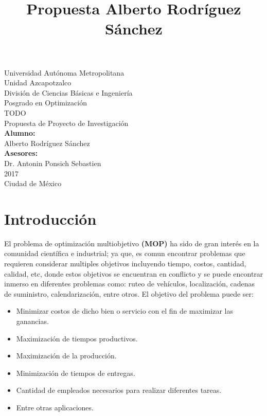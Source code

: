 \documentclass[letterpaper,10pt]{article}
\title{Propuesta Alberto Rodríguez Sánchez}
\begin{document}
\renewcommand{\refname}{Bibliografía}%
\thispagestyle{empty}

\begin{center}
	{\Huge Universidad Autónoma Metropolitana }\\
	{\huge Unidad Azcapotzalco}\\
	\vspace{0.5cm}
	{\Large División de Ciencias Básicas e Ingeniería}\\
	\vspace{1.0cm}
	{\large Posgrado en Optimización}\\
	\vspace{2.0cm}	
	{\Large TODO}\\
	\vspace{1.0cm}
	{\large Propuesta de Proyecto de Investigación}\\
	\vspace{2.0cm}
	{\large\textbf{Alumno:}}\\
	Alberto Rodríguez Sánchez\\
	\vspace{1.5cm}
	\bigskip
	{\large\textbf{Asesores:}}\\ 
	Dr. Antonin Ponsich Sebastien\\
	\vspace{1.5cm}
	 2017\\
	\vspace{1.0cm}
	Ciudad de México\\ 
\end{center}
\newpage
\tableofcontents
\newpage
\section{Introducción}

El problema de optimización multiobjetivo \textbf{(MOP)} ha sido de gran interés en la comunidad científica e industrial; ya que, es comun encontrar problemas que requieren considerar multiples objetivos incluyendo tiempo, costos, cantidad, calidad, etc, donde estos objetivos se encuentran en conflicto y se puede encontrar inmerso en diferentes problemas como: ruteo de vehículos, localización, cadenas de suministro, calendarización, entre otros. El objetivo del problema puede ser:

\begin{itemize}
\item Minimizar costos de dicho bien o servicio con el fin de maximizar las ganancias. 
\item Maximización de tiempos productivos.
\item Maximización de la producción.
\item Minimización de tiempos de entregas.
\item Cantidad de empleados necesarios para realizar diferentes tareas. 
\item Entre otras aplicaciones.
\end{itemize}
\end{document}
